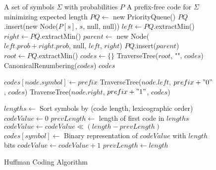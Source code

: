\begin{figure}[tbp]
\centering
\small
\begin{algorithm}
\caption{Huffman Coding Algorithm}\label{alg:huffman}
\begin{algorithmic}[1]
\Require A set of symbols $\Sigma$ with probabilities $P$
\Ensure A prefix-free code for $\Sigma$ minimizing expected length
    \State $PQ \gets$ new PriorityQueue() 
        \State $PQ$.insert(new Node($P[s]$, $s$, null, null))
    \EndFor
        \State $left \gets PQ$.extractMin()
        \State $right \gets PQ$.extractMin()
        \State $parent \gets$ new Node($left.prob + right.prob$, null, $left$, $right$)
        \State $PQ$.insert($parent$)
    \EndWhile
    \State $root \gets PQ$.extractMin()
    \State $codes \gets \{\}$ 
    \State TraverseTree($root$, "", $codes$)
    \State CanonicalRenumbering($codes$) 
    \State \Return $codes$
\EndFunction

     
        \State $codes[node.symbol] \gets prefix$
    \Else
        \State TraverseTree($node.left$, $prefix + "0"$, $codes$)
        \State TraverseTree($node.right$, $prefix + "1"$, $codes$)
    \EndIf
\EndFunction

    \State $lengths \gets$ Sort symbols by (code length, lexicographic order)
    \State $codeValue \gets 0$
    \State $prevLength \gets$ length of first code in $lengths$
        \State $codeValue \gets codeValue \ll (length - prevLength)$ 
        \State $codes[symbol] \gets$ Binary representation of $codeValue$ with $length$ bits
        \State $codeValue \gets codeValue + 1$
        \State $prevLength \gets length$
    \EndFor
\EndFunction
\end{algorithmic}
\end{algorithm}
\end{figure}